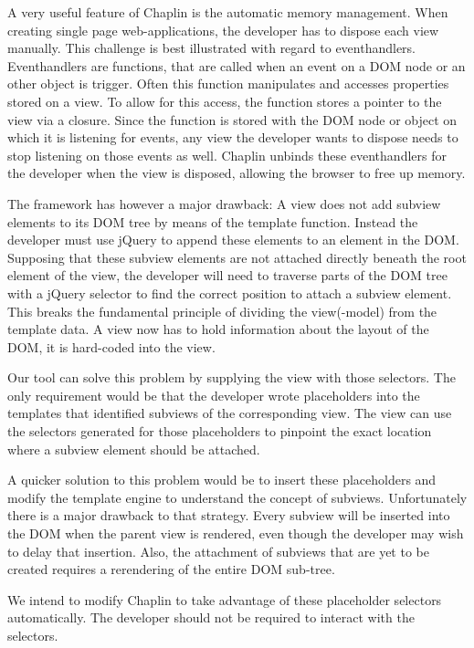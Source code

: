 \documentclass[thesis.tex]{subfiles}
\begin{document}
A very useful feature of Chaplin is the automatic memory management.
When creating single page web-applications, the developer has to dispose each
view manually. This challenge is best illustrated with regard to eventhandlers.
Eventhandlers are functions, that are called when an event on a DOM node or
an other object is trigger. Often this function manipulates and accesses
properties stored on a view. To allow for this access, the function stores a
pointer to the view via a closure. Since the function is stored with the
DOM node or object on which it is listening for events, any view the developer
wants to dispose needs to stop listening on those events as well.
Chaplin unbinds these eventhandlers for the developer when the view is disposed,
allowing the browser to free up memory.

The framework has however a major drawback: A view does not add subview elements
to its DOM tree by means of the template function. Instead the developer
must use jQuery to append these elements to an element in the DOM.
Supposing that these subview elements are not attached directly beneath the root
element of the view, the developer will need to traverse parts of the DOM tree
with a jQuery selector to find the correct position to attach a subview element.
This breaks the fundamental principle of dividing the view(-model) from the
template data. A view now has to hold information about the layout of the DOM,
it is hard-coded into the view.

Our tool can solve this problem by supplying the view with those selectors.
The only requirement would be that the developer wrote placeholders into the
templates that identified subviews of the corresponding view.
The view can use the selectors generated for those placeholders
to pinpoint the exact location where a subview element should be attached.

A quicker solution to this problem would be to insert these placeholders and
modify the template engine to understand the concept of subviews.
Unfortunately there is a major drawback to that strategy.
Every subview will be inserted into the DOM when the parent view is rendered,
even though the developer may wish to delay that insertion.
Also, the attachment of subviews that are yet to be created requires a
rerendering of the entire DOM sub-tree.

We intend to modify Chaplin to take advantage of these placeholder selectors
automatically. The developer should not be required to interact with the
selectors.
\end{document}
